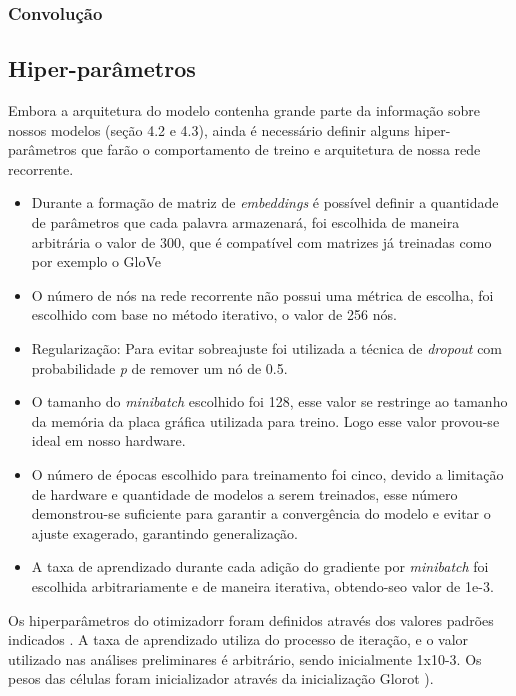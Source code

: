 \documentclass[12pt]{article}
\begin{document}
\subsubsection{Convolução}

\subsection{Hiper-parâmetros}

Embora a arquitetura do modelo contenha grande parte da informação sobre nossos modelos (seção 4.2 e 4.3), ainda é necessário definir alguns hiper-parâmetros que farão o comportamento de treino e arquitetura de nossa rede recorrente.

\begin{itemize}
  \item Durante a formação de matriz de \textit{embeddings} é possível definir a quantidade de parâmetros que cada palavra armazenará, foi escolhida de maneira arbitrária o valor de 300, que é compatível com matrizes já treinadas como por exemplo o GloVe \cite{pennington2014glove}\\
  \item O número de nós na rede recorrente não possui uma métrica de escolha, foi escolhido com base no método iterativo, o valor de 256 nós.\\
  \item Regularização: Para evitar sobreajuste foi utilizada a técnica de \textit{dropout} com probabilidade \textit{p} de remover um nó de 0.5.\\
  \item O tamanho do \textit{minibatch} escolhido foi 128, esse valor se restringe ao tamanho da memória da placa gráfica utilizada para treino. Logo esse valor provou-se ideal em nosso hardware.\\
  \item O número de épocas escolhido para treinamento foi cinco, devido a limitação de hardware e quantidade de modelos a serem treinados, esse número demonstrou-se suficiente para garantir a convergência do modelo e evitar o ajuste exagerado, garantindo generalização.\\
  \item A taxa de aprendizado durante cada adição do gradiente por \textit{minibatch} foi escolhida arbitrariamente e de maneira iterativa, obtendo-seo valor de 1e-3.
\end{itemize}

Os hiperparâmetros do otimizadorr foram definidos através dos valores padrões indicados \cite{DBLP:journals/corr/KingmaB14}. A taxa de aprendizado utiliza do processo de iteração, e o valor utilizado nas análises preliminares é arbitrário, sendo inicialmente 1x10-3. Os pesos das células foram inicializador através da inicialização Glorot \cite{glorot:10}).
\end{document}
